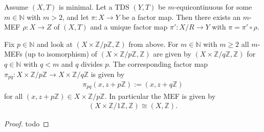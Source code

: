 \begin{theorem}
	Assume $(X, T)$ is minimal. Let a TDS $(Y, T)$ be $m$-equicontinuous for some $m \in \mathbb{N}$ with $m > 2$, and let $\pi: X \to Y$ be a factor map. Then there exists an $m$-MEF $\rho: X \to Z$ of $(X, T)$ and a unique factor map $\pi': X/R \to Y$ with $\pi = \pi' \circ \rho$.
\end{theorem}

\begin{example}
	Fix $p \in \mathbb{N}$ and look at $(X \times \mathbb{Z}/p\mathbb{Z}, \mathbb{Z})$ from above. For $m \in \mathbb{N}$ with $m \geq 2$ all $m$-MEFs (up to isomorphism) of $(X \times \mathbb{Z}/p\mathbb{Z}, \mathbb{Z})$ are given by $(X \times \mathbb{Z}/q\mathbb{Z}, \mathbb{Z})$ for $q \in \mathbb{N}$ with $q < m$ and $q$ divides $p$. The corresponding factor map $\pi_{pq}: X \times \mathbb{Z}/p\mathbb{Z} \to X \times \mathbb{Z}/q\mathbb{Z}$ is given by
	\begin{align*}
		\pi_{pq}(x, z + p\mathbb{Z}) := (x, z + q\mathbb{Z})
	\end{align*}
	for all $(x, z + p\mathbb{Z}) \in X \times \mathbb{Z}/p\mathbb{Z}$. In particular the MEF is given by
	\begin{align*}
		(X \times \mathbb{Z}/1\mathbb{Z}, \mathbb{Z}) \cong (X, \mathbb{Z}).
	\end{align*}
\end{example}
\begin{proof}
	todo
\end{proof}
